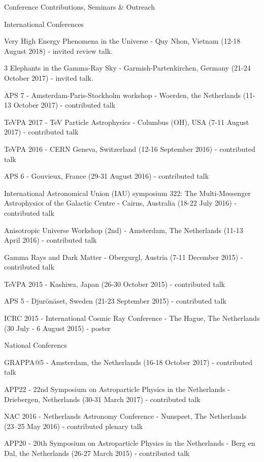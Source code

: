 \begin{rSection}{Conference Contributions, Seminars \& Outreach}
\begin{rSubsection}{International Conferences}{}{}{}
    \item Very High Energy Phenomena in the Universe - Quy Nhon, Vietnam (12-18 August 2018) - invited review talk.
    \item 3 Elephants in the Gamma-Ray Sky - Garmish-Partenkirchen, Germany (21-24 October 2017) - invited talk.
    \item APS 7 - Amsterdam-Paris-Stockholm workshop - Woerden, the Netherlands (11-13 October 2017) - contributed talk
    \item TeVPA 2017 - TeV Particle Astrophysics - Columbus (OH), USA (7-11 August 2017) - contributed talk
    \item TeVPA 2016 - CERN Geneva, Switzerland (12-16 September 2016) - contributed talk
    \item APS 6 - Gouvieux, France (29-31 August 2016) - contributed talk
    \item International Astronomical Union (IAU) symposium 322: The Multi-Messenger Astrophysics of the Galactic Centre - Cairns, Australia (18-22 July 2016) - contributed talk
    \item Anisotropic Universe Workshop (2nd) - Amsterdam, The Netherlands (11-13 April 2016) - contributed talk
    \item Gamma Rays and Dark Matter - Obergurgl, Austria (7-11 December 2015) - contributed talk
    \item TeVPA 2015 - Kashiwa, Japan (26-30 October 2015) - contributed talk
    \item APS 5 - Djurönäset, Sweden (21-23 September 2015) - contributed talk
    \item ICRC 2015 - International Cosmic Ray Conference - The Hague, The Netherlands (30 July - 6 August 2015) - poster
\end{rSubsection}

\begin{rSubsection}{National Conferencs}{}{}{}
    \item GRAPPA@5 - Amsterdam, the Netherlands (16-18 October 2017) - contributed talk
    \item APP22 - 22nd Symposium on Astroparticle Physics in the Netherlands - Driebergen, Netherlands (30-31 March 2017) - contributed talk
    \item NAC 2016 - Netherlands Astronomy Conference - Nunspeet, The Netherlands (23–25 May 2016) - contributed plenary talk
    \item APP20 - 20th Symposium on Astroparticle Physics in the Netherlands - Berg en Dal, the Netherlands (26-27 March 2015) - contributed talk
\end{rSubsection}


\end{rSection}
